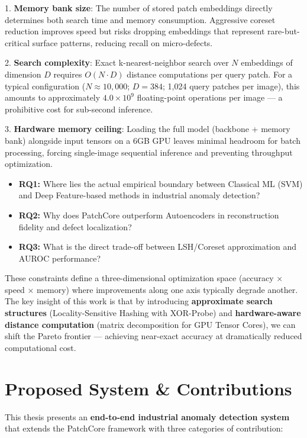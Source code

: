 \documentclass[12pt,a4paper,oneside]{report}
\begin{document}
1. \textbf{Memory bank size}: The number of stored patch embeddings directly determines both search time and memory consumption. Aggressive coreset reduction improves speed but risks dropping embeddings that represent rare-but-critical surface patterns, reducing recall on micro-defects.

2. \textbf{Search complexity}: Exact k-nearest-neighbor search over $N$ embeddings of dimension $D$ requires $O(N \cdot D)$ distance computations per query patch. For a typical configuration ($N \approx 10{,}000$; $D = 384$; 1,024 query patches per image), this amounts to approximately $4.0 \times 10^9$ floating-point operations per image --- a prohibitive cost for sub-second inference.

3. \textbf{Hardware memory ceiling}: Loading the full model (backbone + memory bank) alongside input tensors on a 6GB GPU leaves minimal headroom for batch processing, forcing single-image sequential inference and preventing throughput optimization.

\begin{itemize}
  \item \textbf{RQ1:} Where lies the actual empirical boundary between Classical ML (SVM) and Deep Feature-based methods in industrial anomaly detection?
  \item \textbf{RQ2:} Why does PatchCore outperform Autoencoders in reconstruction fidelity and defect localization?
  \item \textbf{RQ3:} What is the direct trade-off between LSH/Coreset approximation and AUROC performance?
\end{itemize}
These constraints define a three-dimensional optimization space (accuracy × speed × memory) where improvements along one axis typically degrade another. The key insight of this work is that by introducing \textbf{approximate search structures} (Locality-Sensitive Hashing with XOR-Probe) and \textbf{hardware-aware distance computation} (matrix decomposition for GPU Tensor Cores), we can shift the Pareto frontier --- achieving near-exact accuracy at dramatically reduced computational cost.

\section{Proposed System & Contributions}

This thesis presents an \textbf{end-to-end industrial anomaly detection system} that extends the PatchCore framework with three categories of contribution:
\end{document}
